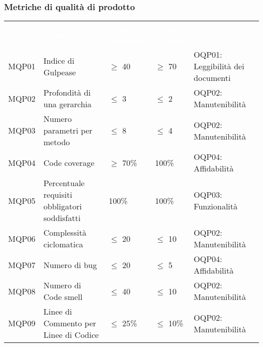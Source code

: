 \subsubsection{Metriche di qualità di prodotto}


\begin{table}[H]
    \renewcommand{\arraystretch}{1.5}
    \begin{tabular}{ m{}<{\centering}  m{}<{\centering}  m{}<{\centering}  m{}<{\centering} m{}<{\centering}}
        \rowcolor{darkblue}
        \textcolor{white}{\textbf{ID}} &\textcolor{white}{\textbf{Nome}}& \textcolor{white}{\textbf{Valore tollerato}} & \textcolor{white}{\textbf{Valore ottimo}} & \textcolor{white}{\textbf{Obiettivo}}\\ 
        MQP01 &
        Indice di Gulpease  &
        $\geq$ 40 &
        $\geq$ 70  &
        OQP01: Leggibilità dei documenti \\


        MQP02 &
        Profondità di una gerarchia &
        $\leq$ 3 &
        $\leq$ 2 &
        OQP02: Manutenibilità \\

        MQP03 &
        Numero parametri per metodo &
        $\leq$ 8 &
        $\leq$ 4 &
        OQP02: Manutenibilità \\


        MQP04 &
        Code coverage &
        $\geq$ 70\% &
        100\% &
        OQP04: Affidabilità \\

        MQP05 &
        Percentuale requisiti obbligatori soddisfatti &
        100\% &
        100\% &
        OQP03: Funzionalità \\


        MQP06 &
        Complessità ciclomatica &
        $\leq$ 20 &
        $\leq$ 10 &
        OQP02: Manutenibilità \\

        MQP07 &
        Numero di bug &
        $\leq$ 20 &
        $\leq$ 5 &
        OQP04: Affidabilità \\


        MQP08 &
        Numero di Code smell &
        $\leq$ 40 &
        $\leq$ 10 &
        OQP02: Manutenibilità \\

        MQP09 &
        Linee di Commento per Linee di Codice  &
        $\leq$ 25\% &
        $\leq$ 10\% &
        OQP02: Manutenibilità \\



\end{tabular}
\end{table}
